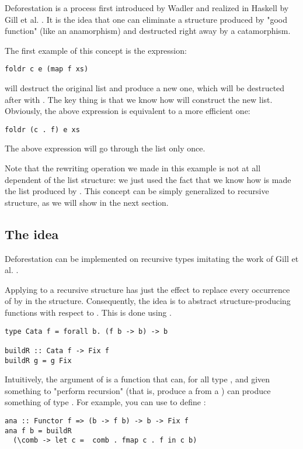 
Deforestation is a process first introduced by Wadler \cite{WADLER1990231} and realized in Haskell by Gill et al. \cite{Gill:1993:SCD:165180.165214}. It is the idea that one can eliminate a structure produced by "good function" (like an anamorphism) and destructed right away by a catamorphism.

The first example of this concept is the expression:
\begin{verbatim}
foldr c e (map f xs)
\end{verbatim}
 will destruct the original list and produce a new one, which will be destructed after with . The key thing is that we know how  will construct the new list. Obviously, the above expression is equivalent to a more efficient one:
\begin{verbatim}
foldr (c . f) e xs
\end{verbatim}
The above expression will go through the list only once.

Note that the rewriting operation we made in this example is not at all dependent of the list structure: we just used the fact that we know how is made the list produced by . This concept can be simply generalized to recursive structure, as we will show in the next section.


\subsection{The idea}
Deforestation can be implemented on recursive types imitating the work of Gill et al. \cite{Gill:1993:SCD:165180.165214}.

Applying  to a recursive structure has just the effect to replace every occurrence of  by  in the structure. Consequently, the idea is to abstract structure-producing functions with respect to . This is done using .

\begin{verbatim}
type Cata f = forall b. (f b -> b) -> b

buildR :: Cata f -> Fix f
buildR g = g Fix
\end{verbatim}

\noindent Intuitively, the argument of  is a function that can, for all type , and given something to "perform recursion" (that is, produce a  from a ) can produce something of type . For example, you can use  to define :
\begin{verbatim}
ana :: Functor f => (b -> f b) -> b -> Fix f
ana f b = buildR
  (\comb -> let c =  comb . fmap c . f in c b)
\end{verbatim}

